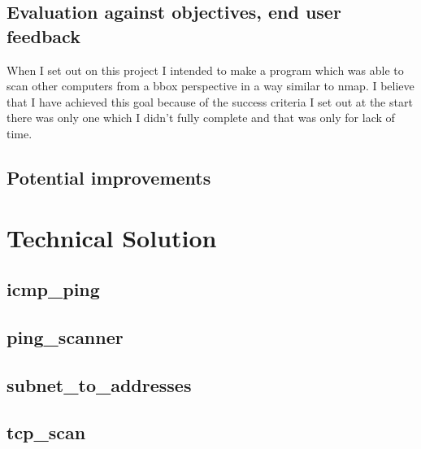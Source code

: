 \documentclass[titlepage]{article}
\let\Oldsection\section{}
\renewcommand{\section}{\FloatBarrier\Oldsection}
\let\Oldsubsection\subsection{}
\renewcommand{\subsection}{\FloatBarrier\Oldsubsection}
\begin{document}
\subsection{Evaluation against objectives, end user feedback}
When I set out on this project I intended to make a program which was able to scan other
computers from a \gls{bbox} perspective in a way similar to nmap. I believe that I have achieved
this goal because of the success criteria I set out at the start there was only one which I didn't
fully complete and that was only for lack of time.


\subsection{Potential improvements}

\appendix

\section{Technical Solution}\label{code}
\lstset{language=Python}
\subsection{icmp\_ping}\label{app:icmpping}



\subsection{ping\_scanner}\label{app:pingscanner}


\subsection{subnet\_to\_addresses}\label{app:subnettoaddresses}


\subsection{tcp\_scan}\label{app:tcpscan}
\end{document}
